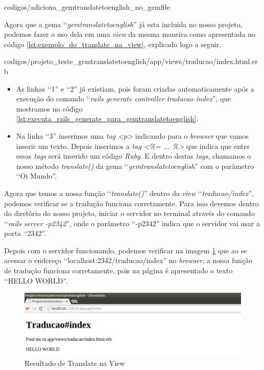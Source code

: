  
{codigos/adiciona_gemtranslatetoenglish_no_gemfile}

Agora que a gema ‘‘\emph{gemtranslatetoenglish}'' já esta incluída no nosso projeto, podemos fazer o uso
dela em uma \emph{view} da mesma maneira como apresentada no código \ref{lst:exemplo_do_translate_na_view},
explicado logo a seguir.


{codigos/projeto_teste_gemtranslatetoenglish/app/views/traducao/index.html.erb}

 \begin{itemize}

  \item As linhas ‘‘1'' e ‘‘2'' já existiam, pois foram criadas automaticamente após a execução do comando
  ‘‘\emph{rails generate controller traducao index}'', que mostramos no código
  \ref{lst:executa_rails_generate_para_gemtranslatetoenglish}.

  \item Na linha ‘‘3'' inserimos uma \emph{tag <p>} indicando para o \emph{browser} que vamos inserir um
  texto. Depois inserimos a \emph{tag <\%= ... \%>} que indica que entre essas \emph{tags} será inserido um
  código \emph{Ruby}. E dentro destas \emph{tags}, chamamos o nosso método \emph{translate()} da gema
  ‘‘\emph{gemtranslatetoenglish}'' com o parâmetro ‘‘Oi Mundo''.

 \end{itemize}

Agora que temos a nossa função ‘‘\emph{translate()}'' dentro da \emph{view} ‘‘\emph{traducao/index}'', podemos
verificar se a tradução funciona corretamente. Para isso devemos dentro do diretório do nosso projeto,
iniciar o servidor no terminal através do comando ‘‘\emph{rails server -p2342}'', onde o parâmetro ‘‘-p2342''
indica que o servidor vai usar a porta ‘‘2342''.

Depois com o servidor funcionando, podemos verificar na imagem \ref{fig:resultado_de_translate_na_view}
que ao se acessar o endereço ‘‘localhost:2342/traducao/index'' no \emph{browser}, a nossa função de
tradução funciona corretamente, pois na página é apresentado o texto ‘‘HELLO WORLD''.

 \begin{figure}[ht]
  \includegraphics[scale=0.49]{images/resultado_de_translate_na_view.png}
  \caption{Resultado de Translate na View}
  \label{fig:resultado_de_translate_na_view}
\end{figure}
